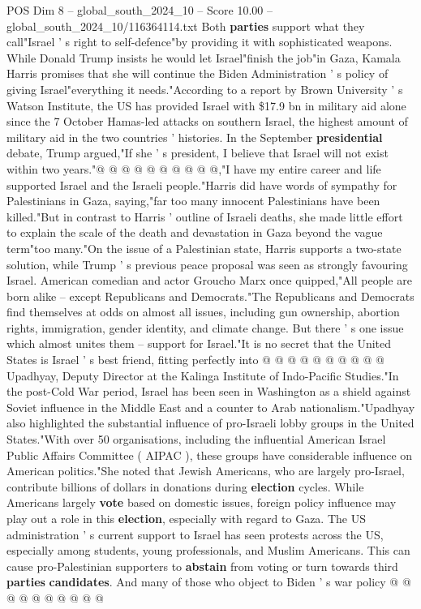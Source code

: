 \begin{textsample}{POS Dim 8 – global\_south\_2024\_10 – Score 10.00 – global\_south\_2024\_10/116364114.txt}
Both \textbf{parties} support what they call"Israel ' s right to self-defence"by providing it with sophisticated weapons.
While Donald Trump insists he would let Israel"finish the job"in Gaza, Kamala Harris promises that she will continue the Biden Administration ' s policy of giving Israel"everything it needs."According to a report by Brown University ' s Watson Institute, the US has provided Israel with \$17.9 bn in military aid alone since the 7 October Hamas-led attacks on southern Israel, the highest amount of military aid in the two countries ' histories.
In the September \textbf{presidential} debate, Trump argued,"If she ' s president, I believe that Israel will not exist within two years."@ @ @ @ @ @ @ @ @ @,"I have my entire career and life supported Israel and the Israeli people."Harris did have words of sympathy for Palestinians in Gaza, saying,"far too many innocent Palestinians have been killed."But in contrast to Harris ' outline of Israeli deaths, she made little effort to explain the scale of the death and devastation in Gaza beyond the vague term"too many."On the issue of a Palestinian state, Harris supports a two-state solution, while Trump ' s previous peace proposal was seen as strongly favouring Israel.
American comedian and actor Groucho Marx once quipped,"All people are born alike -- except Republicans and Democrats."The Republicans and Democrats find themselves at odds on almost all issues, including gun ownership, abortion rights, immigration, gender identity, and climate change.
But there ' s one issue which almost unites them -- support for Israel."It is no secret that the United States is Israel ' s best friend, fitting perfectly into @ @ @ @ @ @ @ @ @ @ Upadhyay, Deputy Director at the Kalinga Institute of Indo-Pacific Studies."In the post-Cold War period, Israel has been seen in Washington as a shield against Soviet influence in the Middle East and a counter to Arab nationalism."Upadhyay also highlighted the substantial influence of pro-Israeli lobby groups in the United States."With over 50 organisations, including the influential American Israel Public Affairs Committee ( AIPAC ), these groups have considerable influence on American politics."She noted that Jewish Americans, who are largely pro-Israel, contribute billions of dollars in donations during \textbf{election} cycles.
While Americans largely \textbf{vote} based on domestic issues, foreign policy influence may play out a role in this \textbf{election}, especially with regard to Gaza.
The US administration ' s current support to Israel has seen protests across the US, especially among students, young professionals, and Muslim Americans.
This can cause pro-Palestinian supporters to \textbf{abstain} from voting or turn towards third \textbf{parties} \textbf{candidates}.
And many of those who object to Biden ' s war policy @ @ @ @ @ @ @ @ @ @

\end{textsample}
